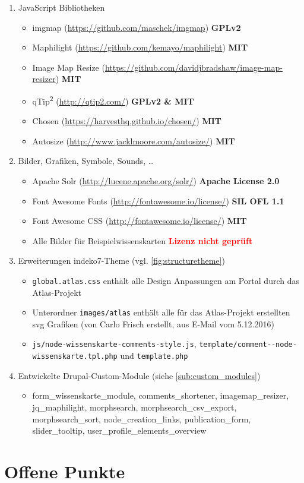 \begin{enumerate}
	\item JavaScript Bibliotheken
	\begin{itemize}
		\item imgmap (\url{https://github.com/maschek/imgmap})  \textbf{GPLv2}
		\item Maphilight (\url{https://github.com/kemayo/maphilight}) \textbf{MIT}
		\item Image Map Resize (\url{https://github.com/davidjbradshaw/image-map-resizer}) \textbf{MIT}
		\item qTip\textsuperscript{2} (\url{http://qtip2.com/}) \textbf{GPLv2 \& MIT}
		\item Chosen (\url{https://harvesthq.github.io/chosen/}) \textbf{MIT}
		\item Autosize (\url{http://www.jacklmoore.com/autosize/}) \textbf{MIT}
	\end{itemize}

	\item Bilder, Grafiken, Symbole, Sounds, \dots\label{sub:license_images}
	\begin{itemize}
		\item Apache Solr (\url{http://lucene.apache.org/solr/}) \textbf{Apache License 2.0}
		\item Font Awesome Fonts (\url{http://fontawesome.io/license/}) \textbf{SIL OFL 1.1}
		\item Font Awesome CSS (\url{http://fontawesome.io/license/}) \textbf{MIT}
		\item Alle Bilder für Beispielwissenskarten \textcolor{red}{\textbf{Lizenz nicht geprüft}}		
	\end{itemize} 

	\item Erweiterungen indeko7-Theme (vgl. \cref{fig:structuretheme})
	\begin{itemize}
		\item \lstinline|global.atlas.css| enthält alle Design Anpassungen am Portal durch das Atlas-Projekt
		\item Unterordner \lstinline|images/atlas| enthält alle für das Atlas-Projekt erstellten svg Grafiken (von Carlo Frisch erstellt, aus E-Mail vom 5.12.2016)
		\item \lstinline|js/node-wissenskarte-comments-style.js|, \lstinline|template/comment--node-wissenskarte.tpl.php| und \lstinline|template.php|
	\end{itemize}

	\item Entwickelte Drupal-Custom-Module (siehe \cref{sub:custom_modules})
	\begin{itemize}
		\item form\_wissenskarte\_module, comments\_shortener, imagemap\_resizer, jq\_maphilight, morphsearch, morphsearch\_csv\_export, morphsearch\_sort, node\_creation\_links, publication\_form, slider\_tooltip, user\_profile\_elements\_overview
	\end{itemize}
\end{enumerate}


\section{Offene Punkte}


\glsaddall
\printglossary[type=\acronymtype,title = Abkürzungsverzeichnis]

\printglossary

%
